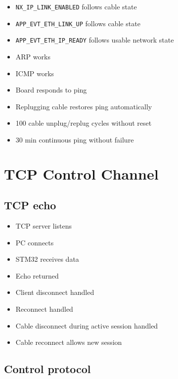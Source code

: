 \documentclass[10pt,a4paper,oneside]{report}
\providecommand{\tightlist}{\setlength{\itemsep}{1pt}\setlength{\parskip}{1pt}}
\begin{document}
\begin{itemize}
\tightlist
\item[$\square$]
  \texttt{NX\_\allowbreak{}IP\_\allowbreak{}LINK\_\allowbreak{}ENABLED} follows cable state
\item[$\square$]
  \texttt{APP\_\allowbreak{}EVT\_\allowbreak{}ETH\_\allowbreak{}LINK\_\allowbreak{}UP} follows cable state
\item[$\square$]
  \texttt{APP\_\allowbreak{}EVT\_\allowbreak{}ETH\_\allowbreak{}IP\_\allowbreak{}READY} follows usable network state
\item[$\square$]
  ARP works
\item[$\square$]
  ICMP works
\item[$\square$]
  Board responds to ping
\item[$\square$]
  Replugging cable restores ping automatically
\item[$\square$]
  100 cable unplug/replug cycles without reset
\item[$\square$]
  30 min continuous ping without failure
\end{itemize}

\section{TCP Control Channel}\label{wiki-hardware-bring-up-and-testing--12-tcp-control-channel}

\subsection{TCP echo}\label{wiki-hardware-bring-up-and-testing--121-tcp-echo}

\begin{itemize}
\tightlist
\item[$\square$]
  TCP server listens
\item[$\square$]
  PC connects
\item[$\square$]
  STM32 receives data
\item[$\square$]
  Echo returned
\item[$\square$]
  Client disconnect handled
\item[$\square$]
  Reconnect handled
\item[$\square$]
  Cable disconnect during active session handled
\item[$\square$]
  Cable reconnect allows new session
\end{itemize}

\subsection{Control protocol}\label{wiki-hardware-bring-up-and-testing--122-control-protocol}
\end{document}
